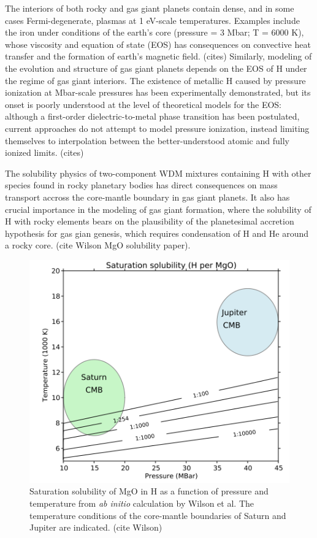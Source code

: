 \documentclass [11pt, proquest, article] {uwthesis}[2016/11/22]
\begin{document}
The interiors of both rocky and gas giant planets contain dense, and in some cases Fermi-degenerate, plasmas at 1 eV-scale temperatures. Examples include the iron under conditions of the earth's core (pressure = 3 Mbar; T = 6000 K), whose viscosity and equation of state (EOS) has consequences on convective heat transfer and the formation of earth's magnetic field. (cites) Similarly, modeling of the evolution and structure of gas giant planets depends on the EOS of H under the regime of gas giant interiors. The existence of metallic H caused by pressure ionization at Mbar-scale pressures has been experimentally demonstrated, but its onset is poorly understood at the level of theoretical models for the EOS: although a first-order dielectric-to-metal phase transition has been postulated, current approaches do not attempt to model pressure ionization, instead limiting themselves to interpolation between the better-understood atomic and fully ionized limits. (cites)

The solubility physics of two-component WDM mixtures containing H with other species found in rocky planetary bodies has direct consequences on mass transport accross the core-mantle boundary in gas giant planets. It also has crucial importance in the modeling of gas giant formation, where the solubility of H with rocky elements bears on the plausibility of the planetesimal accretion hypothesis for gas gian genesis, which requires condensation of H and He around a rocky core. (cite Wilson MgO solubility paper). 

\begin{figure}[h] \label{fig:wilson}
\caption{Saturation solubility of MgO in H as a function of pressure and temperature from \emph{ab initio} calculation by Wilson et al. The temperature conditions of the core-mantle boundaries of Saturn and Jupiter are indicated. (cite Wilson)}
\centering
\includegraphics[scale=0.65]{../Figures/wilson_solubility.png}
\end{figure}
\end{document}
